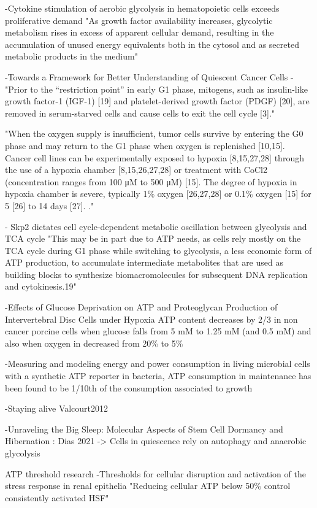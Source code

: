 \documentclass[11pt,a4paper]{article}
\begin{document}
-Cytokine stimulation of aerobic glycolysis in hematopoietic cells exceeds proliferative demand
"As growth factor availability increases, glycolytic metabolism rises in excess of apparent cellular demand, resulting in the accumulation of unused energy equivalents both in the cytosol and as secreted metabolic products in the medium"

-Towards a Framework for Better Understanding of Quiescent Cancer Cells
-"Prior to the “restriction point” in early G1 phase, mitogens, such as insulin-like growth factor-1 (IGF-1) [19] and platelet-derived growth factor (PDGF) [20], are removed in serum-starved cells and cause cells to exit the cell cycle [3]."

"When the oxygen supply is insufficient, tumor cells survive by entering the G0 phase and may return to the G1 phase when oxygen is replenished [10,15]. Cancer cell lines can be experimentally exposed to hypoxia [8,15,27,28] through the use of a hypoxia chamber [8,15,26,27,28] or treatment with CoCl2 (concentration ranges from 100 μM to 500 μM) [15]. The degree of hypoxia in hypoxia chamber is severe, typically 1\% oxygen [26,27,28] or 0.1\% oxygen [15] for 5 [26] to 14 days [27]. ."

- Skp2 dictates cell cycle-dependent metabolic oscillation between glycolysis and TCA cycle
"This may be in part due to ATP needs, as cells rely mostly on the TCA cycle during G1 phase while switching to glycolysis, a less economic form of ATP production, to accumulate intermediate metabolites that are used as building blocks to synthesize biomacromolecules for subsequent DNA replication and cytokinesis.19"

-Effects of Glucose Deprivation on ATP and Proteoglycan Production of Intervertebral Disc Cells under Hypoxia
ATP content decreases by 2/3 in non cancer porcine cells when glucose falls from 5 mM to 1.25 mM (and 0.5 mM)  and also when oxygen in decreased from 20\% to 5\%

-Measuring and modeling energy and power consumption in living microbial cells with a synthetic ATP reporter
in bacteria, ATP consumption in maintenance has been found to be 1/10th of the consumption associated to growth

-Staying alive Valcourt2012

-Unraveling the Big Sleep: Molecular Aspects of Stem Cell Dormancy and Hibernation : Dias 2021 -> Cells in quiescence rely on autophagy and anaerobic glycolysis 

ATP threshold research
-Thresholds for cellular disruption and activation of the stress response in renal epithelia "Reducing cellular ATP below 50\% control consistently activated HSF"
\end{document}
